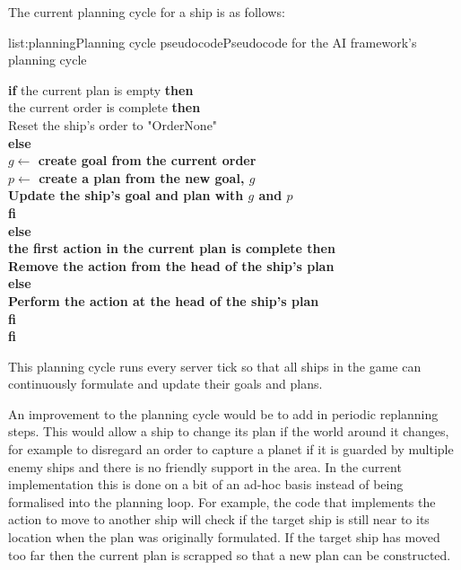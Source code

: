 The current planning cycle for a ship is as follows:

\vspace{-0.5em}
\begin{listing}{list:planning}{Planning cycle pseudocode}{Pseudocode for the AI framework's planning cycle}{}
\end{listing}\vspace{-1.5em}

\begin{tabbing}
{\bf if} the current plan is empty {\bf then} \\
 the current order is complete {\bf then} \\
\quad\quad Reset the ship's order to "OrderNone" \\
\quad\bf else \\
\quad\quad $g \leftarrow$ create goal from the current order \\
\quad\quad $p \leftarrow$ create a plan from the new goal, $g$ \\
\quad\quad Update the ship's goal and plan with $g$ and $p$ \\
\quad\bf fi \\
\bf else \\
 the first action in the current plan is complete {\bf then} \\
\quad\quad Remove the action from the head of the ship's plan \\
\quad\bf else \\
\quad\quad Perform the action at the head of the ship's plan \\
\quad\bf fi \\
\bf fi
\end{tabbing}
\noindent
This planning cycle runs every server tick so that all ships in the game can
continuously formulate and update their goals and plans.

An improvement to the planning cycle would be to add in periodic replanning steps.
This would allow a ship to change its plan if the world around it changes, for example
to disregard an order to capture a planet if it is guarded by multiple enemy ships
and there is no friendly support in the area. In the current implementation this is
done on a bit of an ad-hoc basis instead of being formalised into the planning loop.
For example, the code that implements the action to move to another ship will check
if the target ship is still near to its location when the plan was originally formulated.
If the target ship has moved too far then the current plan is scrapped so that a new
plan can be constructed.
